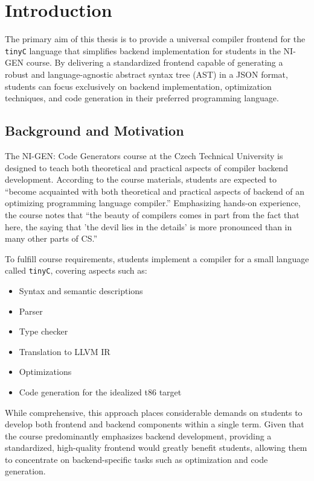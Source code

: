 \chapter{Introduction}

The primary aim of this thesis is to provide a universal compiler frontend for the \texttt{tinyC} language that simplifies backend implementation for students in the NI-GEN course. By delivering a standardized frontend capable of generating a robust and language-agnostic abstract syntax tree (AST) in a JSON format, students can focus exclusively on backend implementation, optimization techniques, and code generation in their preferred programming language.

\section{Background and Motivation}

The NI-GEN: Code Generators course at the Czech Technical University is designed to teach both theoretical and practical aspects of compiler backend development. According to the course materials, students are expected to ``become acquainted with both theoretical and practical aspects of backend of an optimizing programming language compiler.'' Emphasizing hands-on experience, the course notes that ``the beauty of compilers comes in part from the fact that here, the saying that 'the devil lies in the details' is more pronounced than in many other parts of CS.''

To fulfill course requirements, students implement a compiler for a small language called \texttt{tinyC}, covering aspects such as:
\begin{itemize}
\item Syntax and semantic descriptions
\item Parser
\item Type checker
\item Translation to LLVM IR
\item Optimizations
\item Code generation for the idealized t86 target
\end{itemize}

While comprehensive, this approach places considerable demands on students to develop both frontend and backend components within a single term. Given that the course predominantly emphasizes backend development, providing a standardized, high-quality frontend would greatly benefit students, allowing them to concentrate on backend-specific tasks such as optimization and code generation.

